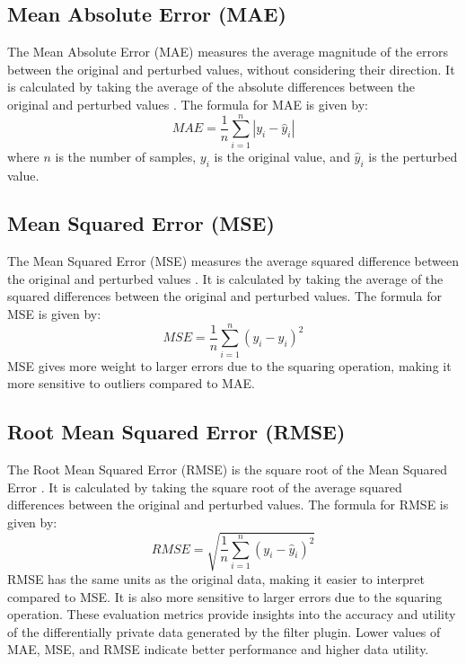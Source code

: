 \subsection{Mean Absolute Error (MAE)}
The Mean Absolute Error (MAE) measures the average magnitude of the errors between the original and perturbed values, without considering their direction. It is calculated by taking the average of the absolute differences between the original and perturbed values \cite{Willmott2005}. The formula for MAE is given by:
\begin{equation}
MAE = \frac{1}{n} \sum_{i=1}^{n} |y_i - \hat{y}_i|
\end{equation}
where $n$ is the number of samples, $y_i$ is the original value, and $\hat{y}_i$ is the perturbed value.
\subsection{Mean Squared Error (MSE)}
The Mean Squared Error (MSE) measures the average squared difference between the original and perturbed values \cite{ZhouWang2009}. It is calculated by taking the average of the squared differences between the original and perturbed values. The formula for MSE is given by:
\begin{equation}
MSE = \frac{1}{n} \sum_{i=1}^{n} (y_i - \hat{y}_i)^2
\end{equation}
MSE gives more weight to larger errors due to the squaring operation, making it more sensitive to outliers compared to MAE.
\subsection{Root Mean Squared Error (RMSE)}
The Root Mean Squared Error (RMSE) is the square root of the Mean Squared Error \cite{Chai2014}. It is calculated by taking the square root of the average squared differences between the original and perturbed values. The formula for RMSE is given by:
\begin{equation}
RMSE = \sqrt{\frac{1}{n} \sum_{i=1}^{n} (y_i - \hat{y}_i)^2}
\end{equation}
RMSE has the same units as the original data, making it easier to interpret compared to MSE. It is also more sensitive to larger errors due to the squaring operation.
These evaluation metrics provide insights into the accuracy and utility of the differentially private data generated by the filter plugin. Lower values of MAE, MSE, and RMSE indicate better performance and higher data utility.

